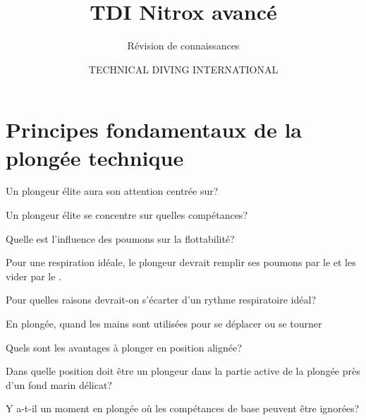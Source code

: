 \documentclass[english,12pt,a4paper]{article}
\title{TDI Nitrox avancé}
\subtitle{Révision de connaissances}
\author{TECHNICAL DIVING INTERNATIONAL}
\begin{document}
	

	\setcounter{section}{1}
	\section{Principes fondamentaux de la plongée technique}

	\begin{outline}
		\1 Un plongeur élite aura son attention centrée sur?
			\2[] \hspace{-2em}\hrulefill
			\2[] \hspace{-2em}\hrulefill
	
		\1 Un plongeur élite se concentre sur quelles compétances?
			\2[] \hspace{-2em}\hrulefill
			\2[] \hspace{-2em}\hrulefill
			\2[] \hspace{-2em}\hrulefill
	
		\1 Quelle est l'influence des poumons sur la flottabilité?
			\2[] \hspace{-2em}\hrulefill
			\2[] \hspace{-2em}\hrulefill
			\2[] \hspace{-2em}\hrulefill
	
		\1 Pour une respiration idéale, le plongeur devrait remplir ses poumons par le \underline{\hspace{1.5cm}} et les vider par le \underline{\hspace{1.5cm}}.
	
		\1 Pour quelles raisons devrait-on s'écarter d'un rythme respiratoire idéal?
			\2[] \hspace{-2em}\hrulefill
			\2[] \hspace{-2em}\hrulefill
	
		\1 En plongée, quand les mains sont utilisées pour se déplacer ou se tourner
			\2[] \hspace{-2em}\hrulefill
			\2[] \hspace{-2em}\hrulefill
	
		\1 Quels sont les avantages à plonger en position alignée?
			\2[] \hspace{-2em}\hrulefill
			\2[] \hspace{-2em}\hrulefill
			\2[] \hspace{-2em}\hrulefill
	
		\1 Dans quelle position doit être un plongeur dans la partie active de la plongée près 	d'un fond marin délicat?
			\2[] \hspace{-2em}\hrulefill
			\2[] \hspace{-2em}\hrulefill

		\1 Y a-t-il un moment en plongée où les compétances de base peuvent être ignorées?
			\2[] \hspace{-2em}\hrulefill
			\2[] \hspace{-2em}\hrulefill
	\end{outline}
	\pagebreak
\end{document}
